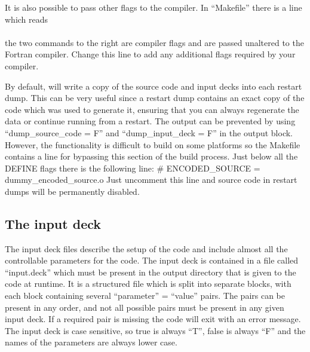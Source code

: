 \documentclass[12pt,a4paper]{article}
\newcommand{\inlinecode}[1]{{\color{warwickred} \bf\texttt{#1}}}
\newcommand{\EPOCH}{{\color{warwickdark}\fontfamily{phv}\selectfont{EPOCH}}}
\newenvironment{boxverbatim}{\lboxverbatim{none}}{\endlboxverbatim}
\begin{document}
It is also possible to pass other flags to the compiler. In ``Makefile'' there
is a line which reads\\
\indent\inlinecode{FFLAGS = -O3 -fast}\\
the two commands to the right are compiler flags and are passed unaltered to
the Fortran compiler. Change this line to add any additional flags required by
your compiler.

By default, {\EPOCH} will write a copy of the source code and input decks
into each restart dump. This can be very useful since a restart dump contains
an exact copy of the code which was used to generate it, ensuring that you
can always regenerate the data or continue running from a restart.
The output can be prevented by using ``dump\_source\_code = F'' and
``dump\_input\_deck = F'' in the output block.
However, the functionality is difficult to build on some platforms so
the Makefile contains a line for bypassing this section of the build
process. Just below all the DEFINE flags there is the following line:
\begin{boxverbatim}
# ENCODED_SOURCE = dummy_encoded_source.o
\end{boxverbatim}
Just uncomment this line and source code in restart dumps will be permanently
disabled.


\subsection{The {\EPOCH} input deck}
The input deck files describe the setup of the code and
include almost all the controllable parameters for the code. The input deck is
contained in a file called ``input.deck'' which must be present in the output
directory that is given to the code at runtime. It is a structured
file which is split into separate blocks, with each block containing several
``parameter'' = ``value'' pairs. The pairs can be present in any order, and not
all possible pairs must be present in any given input deck. If a required pair
is missing the code will exit with an error message. The input deck is case
sensitive, so true is always ``T'', false is always ``F'' and the names of
the parameters are always lower case.\\
\end{document}
